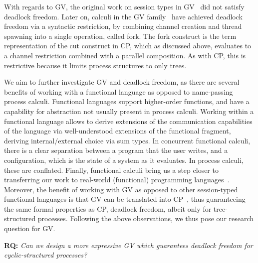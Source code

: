 \documentclass[main.tex]{subfiles}
\begin{document}
With regards to GV, the original work on session types in GV~\cite{gayvasconcelos12} did not satisfy deadlock freedom. Later on, calculi in the GV family~\cite{wadler15,lindleymorris15} have achieved deadlock freedom via a syntactic restriction, \ie by combining channel creation and thread spawning into a single operation, called fork. The fork construct is the term representation of the cut construct in CP, which as discussed above, evaluates to a channel restriction combined with a parallel composition. As with CP, this is restrictive because it limits process structures to only trees.

We aim to further investigate GV and deadlock freedom, as there are several benefits of working with a functional language as opposed to name-passing process calculi. Functional languages support higher-order functions, and have a capability for abstraction not usually present in process calculi. Working within a functional language allows to derive extensions of the communication capabilities of the language via well-understood extensions of the functional fragment, \ie deriving internal/external choice via sum types. In concurrent functional calculi, there is a clear separation between a program that the user writes, and a configuration, which is the state of a system as it evaluates. In process calculi, these are conflated. Finally, functional calculi bring us a step closer to transferring our work to real-world (functional) programming languages~\cite{KD21b}.
Moreover, the benefit of working with GV as opposed to other session-typed functional languages is that GV can be translated into CP~\cite{wadler14}, thus guaranteeing the same formal properties as CP, \eg deadlock freedom, albeit only for tree-structured processes.
Following the above observations, we thus pose our research question for GV.

\textbf{RQ:} \emph{Can we design a more expressive GV which guarantees deadlock freedom for cyclic-structured processes?}
\end{document}
